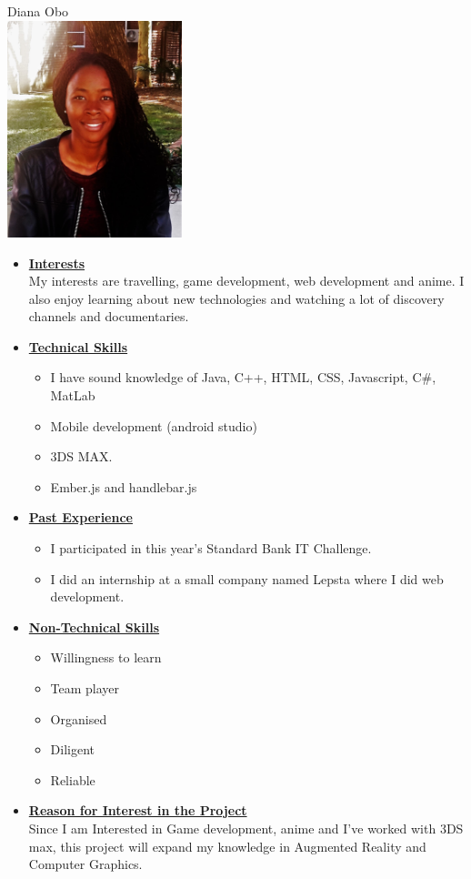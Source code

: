 \documentclass[a4paper,12pt]{article}
\begin{document}
\begin{center}
{\Large Diana {Obo}} \\[0.3cm]
\includegraphics[width= 2in]{Diana.jpg}\\[0.4cm] 
\end{center}

\begin{itemize}
\item {\Large \underline{\textbf{Interests}}}\\[0.2cm]
My interests are travelling, game development, web development and anime. I also enjoy learning about new technologies and watching a lot of discovery channels and documentaries.

\item {\Large \underline{\textbf{Technical Skills}}}
	\begin{itemize}
		\item I have sound knowledge of Java, C++, HTML, CSS, Javascript, C\#, MatLab
		\item Mobile development (android studio) 
		\item 3DS MAX.
		\item Ember.js and  handlebar.js
	\end{itemize}
\bigskip
\item {\Large \underline{\textbf{Past Experience}}}
\begin{itemize}
\item I participated in this year's Standard Bank IT Challenge.
\item I did an internship at a small company named Lepsta where I did web development.
\end{itemize}
\bigskip
\item {\Large \underline{\textbf{Non-Technical Skills}}}
\begin{itemize}
\item Willingness to learn
\item Team player
\item Organised
\item Diligent
\item Reliable
\end{itemize}
\bigskip
\item {\Large \underline{\textbf{Reason for Interest in the Project}}}\\[0.2cm]
Since I am Interested in Game development, anime and I’ve worked with 3DS max, this project will expand my knowledge in Augmented Reality and Computer Graphics.

\end{itemize}
\end{document}
